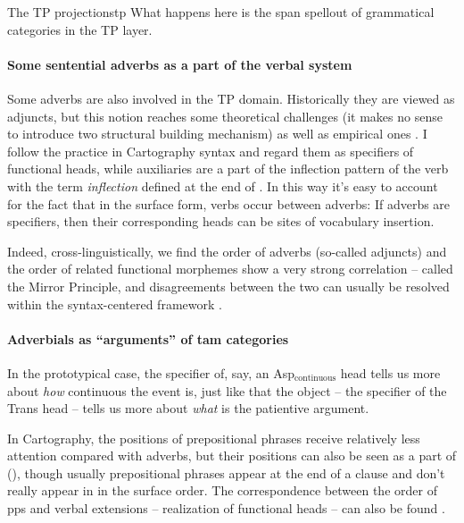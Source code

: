 \documentclass[UTF8, a4paper, oneside, scheme=plain]{ctexrep}
\newcommand*{\citepage}[1]{pp.~{#1}}
\newcommand*{\term}[1]{\emph{#1}}
\begin{document}
\begin{theorybox}{The TP projections}{tp}
    What happens here is the span spellout of grammatical categories in the TP layer.
    \paragraph*{Some sentential adverbs as a part of the verbal system} 
    Some adverbs are also involved in the TP domain.
    Historically they are viewed as adjuncts,
    but this notion reaches some theoretical challenges 
    (it makes no sense to introduce two structural building mechanism)
    as well as empirical ones \citep{sportiche2017fewer}.
    I follow the practice in Cartography syntax and regard them as specifiers of functional heads,
    while auxiliaries are a part of the inflection pattern of the verb 
    with the term \term{inflection} defined 
    at the end of .
    In this way it's easy to account for the fact that 
    in the surface form, verbs occur between adverbs:
    If adverbs are specifiers,
    then their corresponding heads can be sites of vocabulary insertion.

    Indeed, cross-linguistically, 
    we find the order of adverbs (so-called adjuncts) and the order of related functional morphemes 
    show a very strong correlation -- called the Mirror Principle,
    and disagreements between the two can usually be resolved 
    within the syntax-centered framework \citep{harley2010affixation}.

    \paragraph*{Adverbials as ``arguments'' of \acs{tam} categories} In the prototypical case, 
    the specifier of, say, an Asp$_{\text{continuous}}$ head 
    tells us more about \emph{how} continuous the event is,
    just like that the object -- the specifier of the Trans head -- 
    tells us more about \emph{what} is the patientive argument.

    In Cartography, the positions of prepositional phrases receive relatively less attention compared with adverbs,
    but their positions can also be seen as a part of 
    (\citealt[\citepage{106}]{schweikert2005order}),
    though usually prepositional phrases appear at the end of a clause 
    and don't really appear in  in the surface order.
    The correspondence between the order of \acs{pp}s and verbal extensions 
    -- realization of functional heads -- 
    can also be found \citep[\citepage{160}]{cinque2006restructuring}.
    

\end{theorybox}
\end{document}
